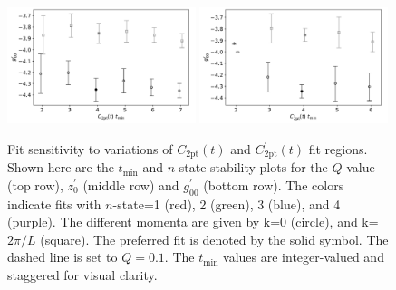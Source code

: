 \documentclass[prd,aps,twocolumn,superscriptaddress,tightenlines,nofootinbib,floatfix,preprintnumbers,10pt]{revtex4-1}
\begin{document}
\begin{figure}[h]
{		\includegraphics[width=0.49\textwidth]{plots/figures/3296_2pt_dgV.pdf}
		\includegraphics[width=0.49\textwidth]{plots/figures/3296_d2pt_dgV.pdf}
		\caption{Fit sensitivity to variations of $C_{\mathrm{2pt}}(t)$ and $C^\prime_{\mathrm{2pt}}(t)$ fit regions. Shown here are the $t_{\mathrm{min}}$ and $n$-state stability plots for the $Q$-value (top row), $z^\prime_0$ (middle row) and $g^\prime_{00}$ (bottom row). The colors indicate fits with $n$-state=1 (red), 2 (green), 3 (blue), and 4 (purple). The different momenta are given by k=0 (circle), and k=$2\pi/L$ (square). The preferred fit is denoted by the solid symbol. The dashed line is set to $Q=0.1$. The $t_{\mathrm{min}}$ values are integer-valued and staggered for visual clarity.}
		\label{fig:stability_c2pt}
}\end{figure}
\end{document}
